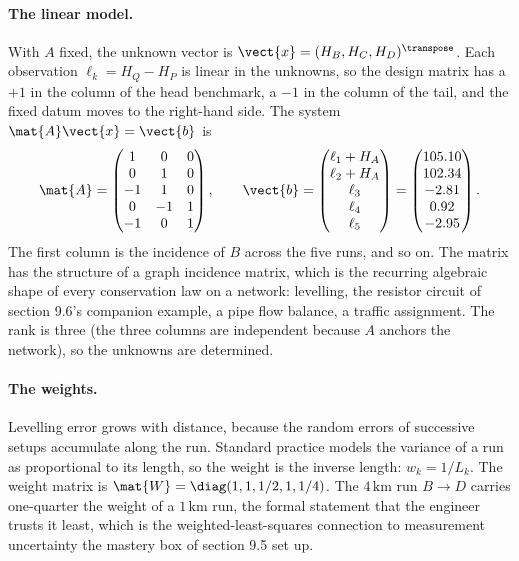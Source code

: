 \paragraph{The linear model.}
With $A$ fixed, the unknown vector is $\vect{x} = (H_{B}, H_{C},
H_{D})^{\transpose}$. Each observation $\ell_{k} = H_{Q} - H_{P}$ is
linear in the unknowns, so the design matrix has a $+1$ in the
column of the head benchmark, a $-1$ in the column of the tail, and
the fixed datum moves to the right-hand side. The system $\mat{A}
\vect{x} = \vect{b}$ is
\[
\mat{A} = \begin{pmatrix}
1 & 0 & 0 \\
0 & 1 & 0 \\
-1 & 1 & 0 \\
0 & -1 & 1 \\
-1 & 0 & 1
\end{pmatrix}, \qquad
\vect{b} = \begin{pmatrix}
\ell_{1} + H_{A} \\ \ell_{2} + H_{A} \\ \ell_{3} \\ \ell_{4} \\ \ell_{5}
\end{pmatrix}
= \begin{pmatrix}
105.10 \\ 102.34 \\ -2.81 \\ 0.92 \\ -2.95
\end{pmatrix}.
\]
The first column is the incidence of $B$ across the five runs, and so
on. The matrix has the structure of a graph incidence matrix, which
is the recurring algebraic shape of every conservation law on a
network: levelling, the resistor circuit of section 9.6's companion
example, a pipe flow balance, a traffic assignment. The rank is three
(the three columns are independent because $A$ anchors the network),
so the unknowns are determined.

\paragraph{The weights.}
Levelling error grows with distance, because the random errors of
successive setups accumulate along the run. Standard practice models
the variance of a run as proportional to its length, so the weight is
the inverse length: $w_{k} = 1/L_{k}$. The weight matrix is
$\mat{W} = \diag(1, 1, 1/2, 1, 1/4)$. The $4\,\si{\kilo\meter}$ run
$B \to D$ carries one-quarter the weight of a $1\,\si{\kilo\meter}$
run, the formal statement that the engineer trusts it least, which is
the weighted-least-squares connection to measurement uncertainty the
mastery box of section 9.5 set up.

